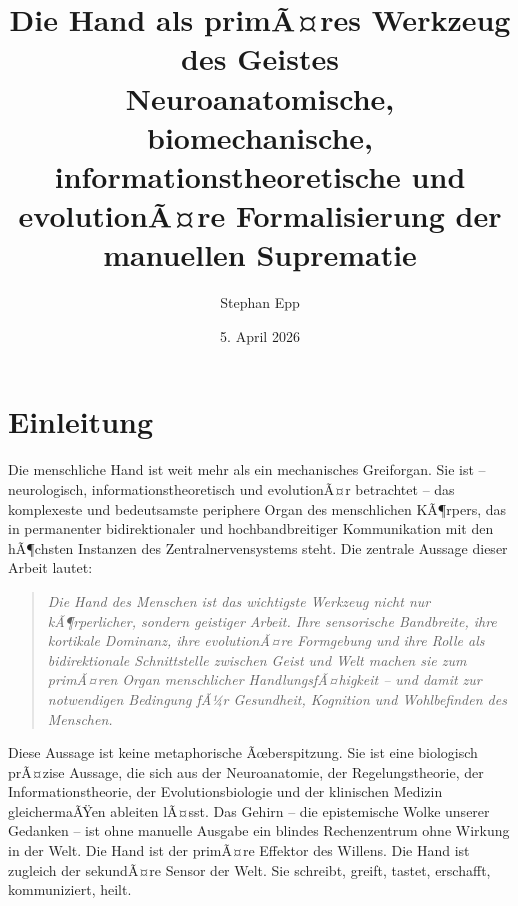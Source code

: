 ﻿\documentclass[12pt,a4paper]{report}
\title{\textbf{Die Hand als primÃ¤res Werkzeug des Geistes}\\[0.5em]
\large Neuroanatomische, biomechanische, informationstheoretische und\\
evolutionÃ¤re Formalisierung der manuellen Suprematie}
\author{Stephan Epp}
\date{5. April 2026}
\theoremstyle{plain}
\theoremstyle{definition}
\theoremstyle{remark}
\begin{document}
\maketitle
\tableofcontents
\newpage
{}

\chapter{Einleitung}

Die menschliche Hand ist weit mehr als ein mechanisches Greiforgan.
Sie ist -- neurologisch, informationstheoretisch und evolutionÃ¤r betrachtet --
das komplexeste und bedeutsamste periphere Organ des menschlichen KÃ¶rpers,
das in permanenter bidirektionaler und hochbandbreitiger Kommunikation
mit den hÃ¶chsten Instanzen des Zentralnervensystems steht. Die zentrale Aussage
dieser Arbeit lautet:

\begin{quote}
\textit{Die Hand des Menschen ist das wichtigste Werkzeug nicht nur
kÃ¶rperlicher, sondern geistiger Arbeit. Ihre sensorische Bandbreite,
ihre kortikale Dominanz, ihre evolutionÃ¤re Formgebung und ihre Rolle
als bidirektionale Schnittstelle zwischen Geist und Welt machen sie zum
primÃ¤ren Organ menschlicher HandlungsfÃ¤higkeit -- und damit zur
notwendigen Bedingung fÃ¼r Gesundheit, Kognition und Wohlbefinden des
Menschen.}
\end{quote}

Diese Aussage ist keine metaphorische Ãœberspitzung. Sie ist eine biologisch
prÃ¤zise Aussage, die sich aus der Neuroanatomie, der Regelungstheorie,
der Informationstheorie, der Evolutionsbiologie und der klinischen Medizin
gleichermaÃŸen ableiten lÃ¤sst. Das Gehirn -- die epistemische Wolke unserer
Gedanken \cite{epp2026brn} -- ist ohne manuelle Ausgabe ein blindes
Rechenzentrum ohne Wirkung in der Welt. Die Hand ist der primÃ¤re Effektor
des Willens. Die Hand ist zugleich der sekundÃ¤re Sensor der Welt.
Sie schreibt, greift, tastet, erschafft, kommuniziert, heilt.
\end{document}
